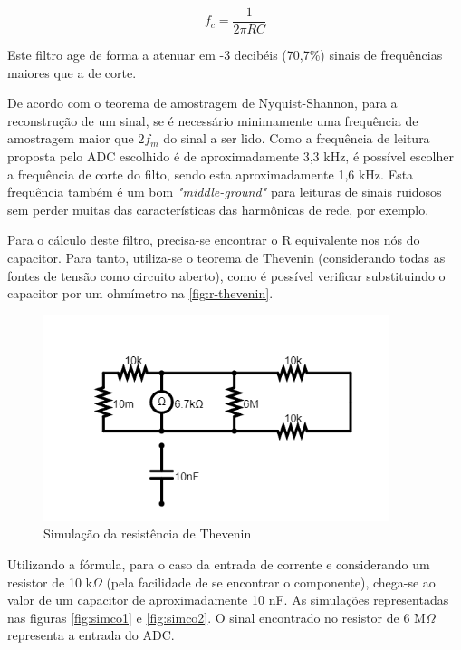 \begin{equation}
    \label{eqcap}
    f_{c} = \frac{1}{2\pi RC}
\end{equation}

Este filtro age de forma a atenuar em -3 decibéis (70,7\%) sinais de frequências maiores que a de corte.

De acordo com o teorema de amostragem de Nyquist-Shannon, para a reconstrução de um sinal, se é necessário minimamente uma frequência de amostragem maior que $2f_{m}$ do sinal a ser lido. Como a frequência de leitura proposta pelo ADC escolhido é de aproximadamente 3,3 kHz, é possível escolher a frequência de corte do filto, sendo esta aproximadamente 1,6 kHz. Esta frequência também é um bom \textit{"middle-ground"} para leituras de sinais ruidosos sem perder muitas das características das harmônicas de rede, por exemplo.

Para o cálculo deste filtro, precisa-se encontrar o R equivalente nos nós do capacitor. Para tanto, utiliza-se o teorema de Thevenin (considerando todas as fontes de tensão como circuito aberto), como é possível verificar substituindo o capacitor por um ohmímetro na \autoref{fig:r-thevenin}.

\begin{figure}[htb!]
    \caption{Simulação da resistência de Thevenin}
    \label{fig:r-thevenin}
    \includegraphics[width=0.9\textwidth]{figuras/r-thevenin.png}
    \fonte{}
\end{figure}

Utilizando a fórmula, para o caso da entrada de corrente e considerando um resistor de 10 k$\Omega$ (pela facilidade de se encontrar o componente), chega-se ao valor de um capacitor de aproximadamente 10 nF. As simulações representadas nas figuras \ref{fig:simco1} e \ref{fig:simco2}. O sinal encontrado no resistor de 6 M$\Omega$ representa a entrada do \gls{ADC}.

